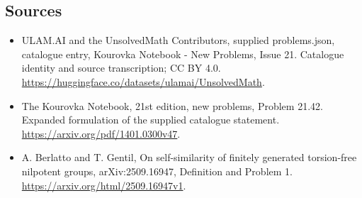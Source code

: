 \documentclass[11pt,a4paper]{article}
\begin{document}
\subsection{Sources}
\begin{itemize}
\item[S1] ULAM.AI and the UnsolvedMath Contributors, supplied problems.json, catalogue entry, Kourovka Notebook - New Problems, Issue 21. Catalogue identity and source transcription; CC BY 4.0.
\url{https://huggingface.co/datasets/ulamai/UnsolvedMath}.
\item[S2] The Kourovka Notebook, 21st edition, new problems, Problem 21.42. Expanded formulation of the supplied catalogue statement.
\url{https://arxiv.org/pdf/1401.0300v47}.
\item[S3] A. Berlatto and T. Gentil, On self-similarity of finitely generated torsion-free nilpotent groups, arXiv:2509.16947, Definition and Problem 1.
\url{https://arxiv.org/html/2509.16947v1}.
\end{itemize}
\end{document}
